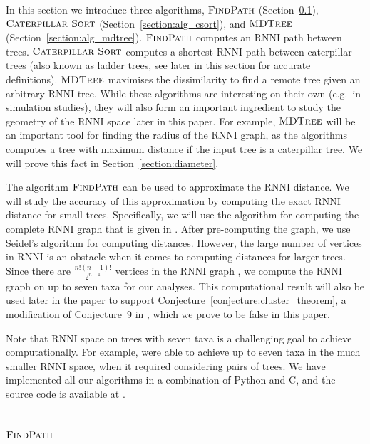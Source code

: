 \documentclass{amsart}
\newcommand{\rnni}{\mathrm{RNNI}}
\newcommand{\csort}{\textsc{Caterpillar Sort}}
\newcommand{\findpath}{\textsc{FindPath}}
\newcommand{\mdtree}{\textsc{MDTree}}
\begin{document}
In this section we introduce three algorithms, $\findpath$ (Section~\ref{section:alg_findpath}), $\csort$ (Section~\ref{section:alg_csort}), and $\mdtree$ (Section~\ref{section:alg_mdtree}).
$\findpath$ computes an $\rnni$ path between trees.
$\csort$ computes a shortest $\rnni$ path between caterpillar trees (also known as ladder trees, see later in this section for accurate definitions).
$\mdtree$ maximises the dissimilarity to find a remote tree given an arbitrary $\rnni$ tree.
While these algorithms are interesting on their own (e.g.\ in simulation studies), they will also form an important ingredient to study the geometry of the $\rnni$ space later in this paper.
For example, $\mdtree$ will be an important tool for finding the radius of the $\rnni$ graph, as the algorithms computes a tree with maximum distance if the input tree is a caterpillar tree.
We will prove this fact in Section~\ref{section:diameter}.

The algorithm $\findpath$ can be used to approximate the $\rnni$ distance.
We will study the accuracy of this approximation by computing the exact $\rnni$ distance for small trees.
Specifically, we will use the algorithm for computing the complete $\rnni$ graph that is given in \autocite[Section 3.3]{Gavryushkin2018-ol}.
After pre-computing the graph, we use Seidel's algorithm \autocite{seidel_all-pairs-shortest-path_1995} for computing distances.
However, the large number of vertices in $\rnni$ is an obstacle when it comes to computing distances for larger trees.
Since there are $\frac{n!(n-1)!}{2^{n-1}}$ vertices in the $\rnni$ graph \autocite{Gavryushkin2018-ol}, we compute the $\rnni$ graph on up to seven taxa for our analyses.
This computational result will also be used later in the paper to support Conjecture~\ref{conjecture:cluster_theorem}, a modification of Conjecture~9 in \autocite{Gavryushkin2018-ol}, which we prove to be false in this paper.

Note that $\rnni$ space on trees with seven taxa is a challenging goal to achieve computationally.
For example, \textcite{Whidden2016-kl} were able to achieve up to seven taxa in the much smaller $\rnni$ space, when it required considering pairs of trees.
We have implemented all our algorithms in a combination of Python and C, and the source code is available at \autocite{Collienne2019}.


\subsection{$\findpath$}
\label{section:alg_findpath}
\end{document}
